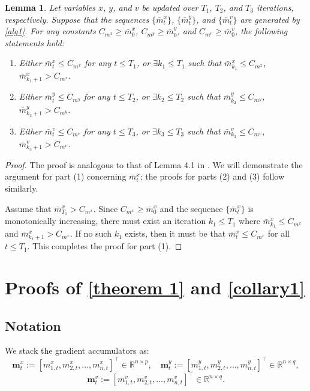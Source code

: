 \documentclass{article}
\theoremstyle{plain}
\newtheorem{lemma}[lemma]{Lemma}
\theoremstyle{definition}
\theoremstyle{remark}
\begin{document}
\begin{lemma}\label{Lemma6}
Let variables \(x\), \(y\), and \(v\) be updated over \(T_1\), \(T_2\), and \(T_3\) iterations, respectively. Suppose that the sequences \(\{\bar{m}^x_{t}\}\), \(\{\bar{m}^y_{t}\}\), and \(\{\bar{m}^v_{t}\}\) are generated by \cref{alg1}. For any constants \(C_{m^x} \geq \bar{m}^x_{0}\), \(C_{m^y} \geq \bar{m}^y_{0}\), and \(C_{m^v} \geq \bar{m}^v_{0}\), the following statements hold:
\begin{enumerate}
    \item[(1)] Either \(\bar{m}^x_{t} \leq C_{m^x}\) for any \(t \leq T_1\), or \(\exists k_1 \leq T_1\) such that \(\bar{m}^x_{k_1} \leq C_{m^x}\), \(\bar{m}^x_{k_1+1} > C_{m^x}\).
    \item[(2)] Either \(\bar{m}^y_{t} \leq C_{m^y}\) for any \(t \leq T_2\), or \(\exists k_2 \leq T_2\) such that \(\bar{m}^y_{k_2} \leq C_{m^y}\), \(\bar{m}^y_{k_2+1} > C_{m^y}\).
    \item[(3)] Either \(\bar{m}^v_{t} \leq C_{m^v}\) for any \(t \leq T_3\), or \(\exists k_3 \leq T_3\) such that \(\bar{m}^v_{k_3} \leq C_{m^v}\), \(\bar{m}^v_{k_3+1} > C_{m^v}\).
\end{enumerate}
\end{lemma}

\begin{proof}
The proof is analogous to that of Lemma 4.1 in \citep{ward2020adagrad}. We will demonstrate the argument for part (1) concerning \(\bar{m}^x_{t}\); the proofs for parts (2) and (3) follow similarly.

Assume that \(\bar{m}^x_{T_1} > C_{m^x}\). Since \(C_{m^x} \geq \bar{m}^x_{0}\) and the sequence \(\{\bar{m}^x_{t}\}\) is monotonically increasing, there must exist an iteration \(k_1 \leq T_1\) where \(\bar{m}^x_{k_1} \leq C_{m^x}\) and \(\bar{m}^x_{k_1+1} > C_{m^x}\).
If no such \(k_1\) exists, then it must be that \(\bar{m}^x_{t} \leq C_{m^x}\) for all \(t \leq T_1\).
This completes the proof for part (1). 
\end{proof}

\section{Proofs of \cref{theorem 1} and \cref{collary1}}
\subsection{Notation}

We stack the gradient accumulators as: 
\begin{equation}
    \mathbf{m}^x_t := [m^x_{1,t}, m^x_{2,t}, \dots, m^x_{n,t}]^\top \in \mathbb{R}^{n \times p},\quad
    \mathbf{m}^y_t:= [m^y_{1,t}, m^y_{2,t}, \dots, m^y_{n,t}]^\top \in \mathbb{R}^{n \times q},\nonumber
    \end{equation}
    \begin{equation}
        \mathbf{m}^v_t := [m^v_{1,t}, m^v_{2,t}, \dots, m^v_{n,t}]^\top \in \mathbb{R}^{n \times q}.
    \end{equation}
\end{document}
